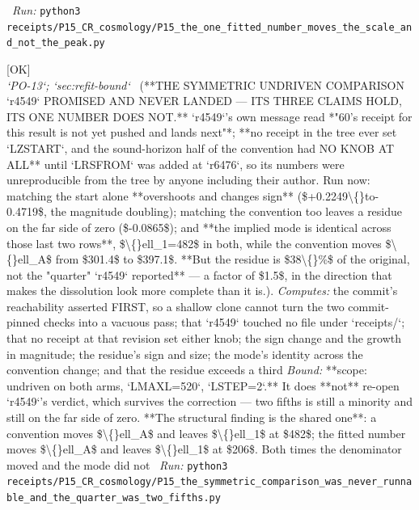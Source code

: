 \begin{description}
\ \emph{Run:} \texttt{python3 receipts/P15\_CR\_cosmology/P15\_the\_one\_fitted\_number\_moves\_the\_scale\_and\_not\_the\_peak.py}
\item[\rcptlabel{P15_the_symmetric_comparison_was_never_runnable_and_the_quarter_was_two_fifths}{P15R7}\textbf{P15R7}\quad\texttt{P15\_the\_symmetric\_comparison\_was\_never\_runnable\_and\_the\_quarter\_was\_two\_fifths}]\hfill\textsf{[OK]}\\
\textit{`PO-13`; `sec:refit-bound`} \ (**THE SYMMETRIC UNDRIVEN COMPARISON `r4549` PROMISED AND NEVER LANDED --- ITS THREE CLAIMS HOLD, ITS ONE NUMBER DOES NOT.** `r4549`'s own message read *"60's receipt for this result is not yet pushed and lands next"*; **no receipt in the tree ever set `LZSTART`, and the sound-horizon half of the convention had NO KNOB AT ALL** until `LRSFROM` was added at `r6476`, so its numbers were unreproducible from the tree by anyone including their author. Run now: matching the start alone **overshoots and changes sign** (\$+0.2249\textbackslash\{\}to-0.4719\$, the magnitude doubling); matching the convention too leaves a residue on the far side of zero (\$-0.0865\$); and **the implied mode is identical across those last two rows**, \$\textbackslash\{\}ell\_1=482\$ in both, while the convention moves \$\textbackslash\{\}ell\_A\$ from \$301.4\$ to \$397.1\$.  **But the residue is \$38\textbackslash\{\}\%\$ of the original, not the "quarter" `r4549` reported** --- a factor of \$1.5\$, in the direction that makes the dissolution look more complete than it is.). 
\emph{Computes:} the commit's reachability asserted FIRST, so a shallow clone cannot turn the two commit-pinned checks into a vacuous pass; that `r4549` touched no file under `receipts/`; that no receipt at that revision set either knob; the sign change and the growth in magnitude; the residue's sign and size; the mode's identity across the convention change; and that the residue exceeds a third
 \emph{Bound:} **scope: undriven on both arms, `LMAXL=520`, `LSTEP=2`.** It does **not** re-open `r4549`'s verdict, which survives the correction --- two fifths is still a minority and still on the far side of zero.  **The structural finding is the shared one**: a convention moves \$\textbackslash\{\}ell\_A\$ and leaves \$\textbackslash\{\}ell\_1\$ at \$482\$; the fitted number moves \$\textbackslash\{\}ell\_A\$ and leaves \$\textbackslash\{\}ell\_1\$ at \$206\$. Both times the denominator moved and the mode did not
\ \emph{Run:} \texttt{python3 receipts/P15\_CR\_cosmology/P15\_the\_symmetric\_comparison\_was\_never\_runnable\_and\_the\_quarter\_was\_two\_fifths.py}

\end{description}
